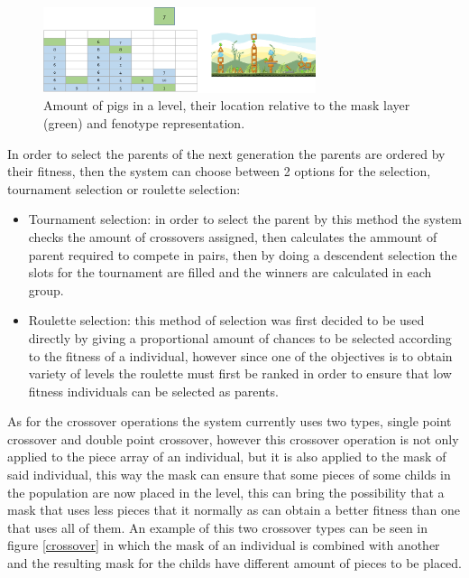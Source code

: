 \documentclass[conference]{IEEEtran}
\begin{document}
    \begin{figure}[htbp]
        \centerline{\includegraphics[width=80mm]{Images/enemy_layer.png}}
        \caption{Amount of pigs in a level, their location relative to the mask layer (green) and fenotype representation.}
        \label{enemy_layer}
    \end{figure}
    
    In order to select the parents of the next generation the parents are ordered by
    their fitness, then the system can choose between 2 options for the selection,
    tournament selection or roulette selection:
    
    \begin{itemize}
        \item Tournament selection: in order to select the parent by this method the
        system checks the amount of crossovers assigned, then calculates the ammount
        of parent required to compete in pairs, then by doing a descendent selection
        the slots for the tournament are filled and the winners are calculated in
        each group.
        \item Roulette selection: this method of selection was first decided to be
        used directly by giving a proportional amount of chances to be selected
        according to the fitness of a individual, however since one of the
        objectives is to obtain variety of levels the roulette must first be ranked
        in order to ensure that low fitness individuals can be selected as parents.
    \end{itemize}
    
    As for the crossover operations the system currently uses two types, single
    point crossover and double point crossover, however this crossover operation is
    not only applied to the piece array of an individual, but it is also applied to
    the mask of said individual, this way the mask can ensure that some pieces of
    some childs in the population are now placed in the level, this can bring the
    possibility that a mask that uses less pieces that it normally as can obtain a
    better fitness than one that uses all of them. An example of this two crossover
    types can be seen in figure \ref{crossover} in which the mask of an individual
    is combined with another and the resulting mask for the childs have different
    amount of pieces to be placed.
    
\end{document}
